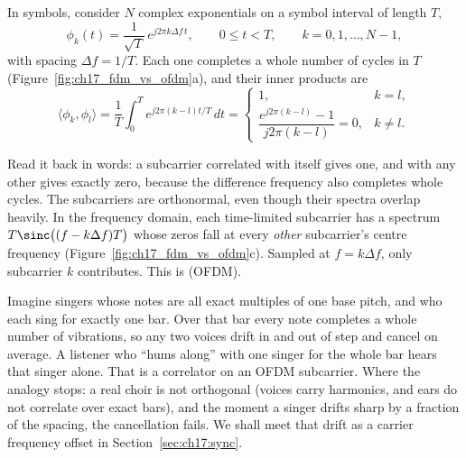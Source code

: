 In symbols, consider $N$ complex exponentials on a symbol interval of length $T$,
\begin{equation}
\phi_k(t)=\frac{1}{\sqrt T}\,e^{j2\pi k\Delta f\,t},\qquad 0\le t<T,\qquad k=0,1,\dots,N-1,
\label{eq:ch17:subcarrier}
\end{equation}
with spacing $\Delta f=1/T$. Each one completes a whole number of cycles in $T$
(Figure~\ref{fig:ch17_fdm_vs_ofdm}a), and their inner products are
\begin{equation}
\langle\phi_k,\phi_l\rangle=\frac1T\int_0^T e^{j2\pi(k-l)t/T}\,dt=
\begin{cases}1,&k=l,\\[2pt] \dfrac{e^{j2\pi(k-l)}-1}{j2\pi(k-l)}=0,&k\ne l.\end{cases}
\label{eq:ch17:orth}
\end{equation}

Read it back in words: a subcarrier correlated with itself gives one, and with any other gives
exactly zero, because the difference frequency also completes whole cycles. The subcarriers are
orthonormal, even though their spectra overlap heavily. In the frequency domain, each
time-limited subcarrier has a spectrum $T\sinc\big((f-k\Delta f)T\big)$ whose zeros fall at every
\emph{other} subcarrier's centre frequency (Figure~\ref{fig:ch17_fdm_vs_ofdm}c). Sampled at
$f=k\Delta f$, only subcarrier $k$ contributes. This is  (OFDM).

\begin{analogy}
Imagine singers whose notes are all exact multiples of one base pitch, and who each sing for
exactly one bar. Over that bar every note completes a whole number of vibrations, so any two
voices drift in and out of step and cancel on average. A listener who ``hums along'' with one
singer for the whole bar hears that singer alone. That is a correlator on an OFDM subcarrier.
Where the analogy stops: a real choir is not orthogonal (voices carry harmonics, and ears do not
correlate over exact bars), and the moment a singer drifts sharp by a fraction of the spacing, the
cancellation fails. We shall meet that drift as a carrier frequency offset in
Section~\ref{sec:ch17:sync}.
\end{analogy}

